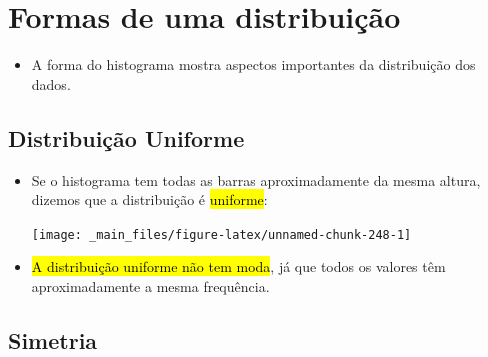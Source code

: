 \documentclass[
  11pt]{report}
\providecommand{\tightlist}{%
  \setlength{\itemsep}{0pt}\setlength{\parskip}{0pt}}
\begin{document}
\hypertarget{formas-de-uma-distribuiuxe7uxe3o}{%
\section{Formas de uma distribuição}\label{formas-de-uma-distribuiuxe7uxe3o}}

\begin{itemize}
\tightlist
\item
  A forma do histograma mostra aspectos importantes da distribuição dos dados.
\end{itemize}

\hypertarget{distribuiuxe7uxe3o-uniforme}{%
\subsection{Distribuição Uniforme}\label{distribuiuxe7uxe3o-uniforme}}

\begin{itemize}
\item
  Se o histograma tem todas as barras aproximadamente da mesma altura, dizemos que a distribuição é {\hl{uniforme}}:

  \begin{center}\texttt{[image: \_main\_files/figure-latex/unnamed-chunk-248-1]} \end{center}
\item
  {\hl{A distribuição uniforme não tem moda}}, já que todos os valores têm aproximadamente a mesma frequência.
\end{itemize}

\hypertarget{simetria}{%
\subsection{Simetria}\label{simetria}}
\end{document}
